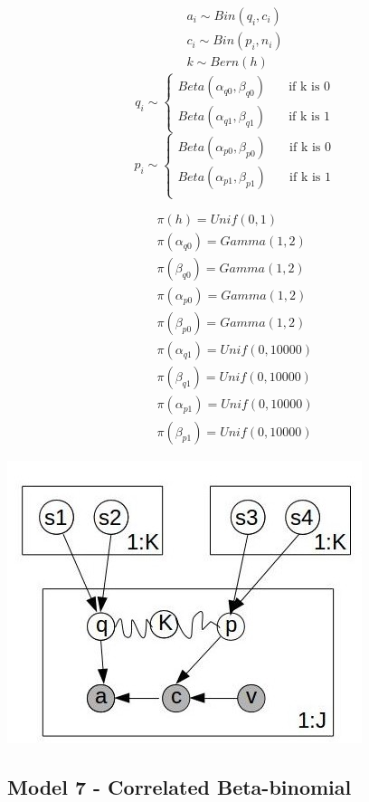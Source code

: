 \documentclass[11pt,a4,singlespacing,titlepagenumber=on]{scrreprt}
\numberwithin{equation}{chapter} %
\theoremstyle{remark}
\begin{document}
 \begin{align}
	a_i \sim Bin(q_i,c_i) \\
	c_i \sim Bin(p_i,n_i) \\
	k \sim Bern(h) 
\end{align}
	\[ 
	q_i \sim 
  	\begin{cases}
		Beta(\alpha_{q0},\beta_{q0}) & \quad \text{if k is 0}\\
		Beta(\alpha_{q1},\beta_{q1}) & \quad \text{if k is 1}
	\end{cases}
	\]
	\[
	p_i \sim 
  	\begin{cases}
		Beta(\alpha_{p0},\beta_{p0}) & \quad \text{if k is 0}\\
		Beta(\alpha_{p1},\beta_{p1}) & \quad \text{if k is 1}\\
	\end{cases}
	\]

 \begin{align}
	\pi(h) = Unif(0,1) \\
	\pi(\alpha_{q0}) = Gamma(1,2) \\
	\pi(\beta_{q0}) = Gamma(1,2) \\
	\pi(\alpha_{p0}) = Gamma(1,2) \\
	\pi(\beta_{p0}) = Gamma(1,2) \\
	\pi(\alpha_{q1}) = Unif(0,10000) \\
	\pi(\beta_{q1}) = Unif(0,10000) \\
	\pi(\alpha_{p1}) = Unif(0,10000) \\
	\pi(\beta_{p1}) = Unif(0,10000)
\end{align}

\includegraphics{GraphMod.jpg}

\subsection{Model 7 - Correlated Beta-binomial }
\end{document}
